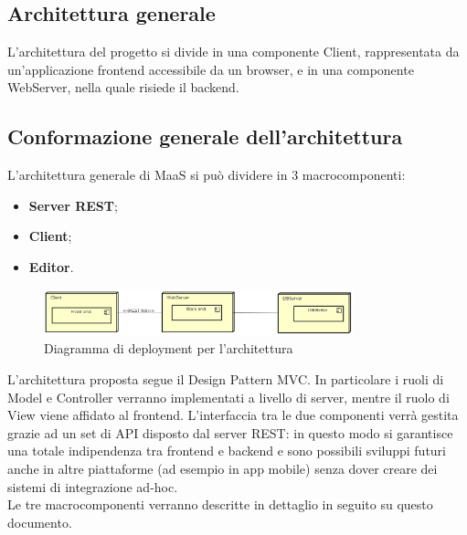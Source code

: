 \subsection{Architettura generale}
L'architettura del progetto si divide in una componente Client, rappresentata da un'applicazione frontend accessibile da un browser, e in una componente WebServer, nella quale risiede il backend. 

\subsection{Conformazione generale dell'architettura}
L'architettura generale di MaaS si può dividere in 3 macrocomponenti:
\begin{itemize}
\item \textbf{Server REST}; 
\item \textbf{Client}; 
\item \textbf{Editor}.
\end{itemize}
\begin{figure}[h]
\centering
\includegraphics[width=0.8\textwidth]{res/sections/GeneralArchitecture.png}
\caption{Diagramma di deployment per l'architettura}
\end{figure}
L'architettura proposta segue il Design Pattern MVC. In particolare i ruoli di Model e Controller verranno implementati a livello di server, mentre il ruolo di View viene affidato al frontend. L'interfaccia tra le due componenti verrà gestita grazie ad un set di API disposto dal server REST: in questo modo si garantisce una totale indipendenza tra frontend e backend e sono possibili sviluppi futuri anche in altre piattaforme (ad esempio in app mobile) senza dover creare dei sistemi di integrazione ad-hoc. \\
Le tre macrocomponenti verranno descritte in dettaglio in seguito su questo documento.
